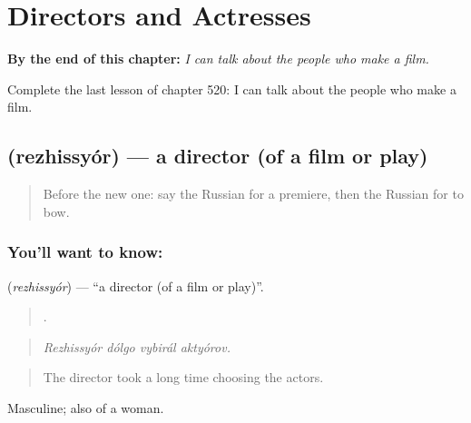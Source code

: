 
\chapter{Directors and Actresses}
\label{ch:ru-directors-and-actresses}

\begin{chapteropening}
\textbf{By the end of this chapter:} \emph{I can talk about the people who make a film.}

Complete the last lesson of chapter 520: I can talk about the people who make a film.
\end{chapteropening}

\section[\texorpdfstring{\ru{режиссёр} (rezhissyór)}{режиссёр (rezhissyór)}]{ (rezhissyór) — a director (of a film or play)}

\label{lesson:RU-C520-rezhissyor}



\begin{quote}
Before the new one: say the Russian for a premiere, then the Russian for to bow.
\end{quote}

\subsection*{You'll want to know: }
\textbf{} (\emph{rezhissyór}) — \textquotedblleft{}a director (of a film or play)\textquotedblright{}.

\begin{quote}
   .
\end{quote}

\begin{quote}
\emph{Rezhissyór dólgo vybirál aktyórov.}
\end{quote}

\begin{quote}
The director took a long time choosing the actors.
\end{quote}

Masculine; also of a woman.

